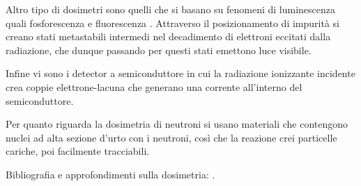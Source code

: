 Altro tipo di dosimetri sono quelli che si basano su fenomeni di luminescenza quali fosforescenza e fluorescenza \cite{TLD}. Attraverso il posizionamento di impurità si creano stati metastabili intermedi nel decadimento di elettroni eccitati dalla radiazione, che dunque passando per questi stati emettono luce visibile.

Infine vi sono i detector a semiconduttore in cui la radiazione ionizzante incidente crea coppie elettrone-lacuna che generano una corrente all'interno del semiconduttore.

Per quanto riguarda la dosimetria di neutroni si usano materiali che contengono nuclei ad alta sezione d'urto con i neutroni, così che la reazione crei particelle cariche, poi facilmente tracciabili. 

Bibliografia e approfondimenti sulla dosimetria: \cite{Corvisiero2} \cite{Beringer3} \cite{Laitano}.
